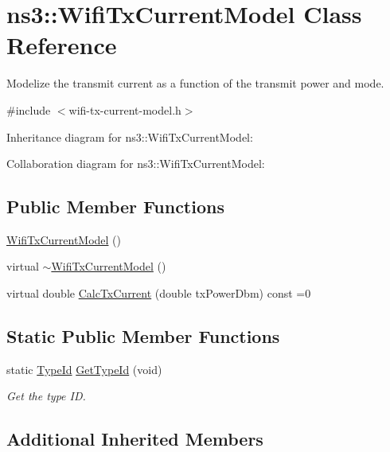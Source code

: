 \hypertarget{classns3_1_1WifiTxCurrentModel}{}\section{ns3\+:\+:Wifi\+Tx\+Current\+Model Class Reference}
\label{classns3_1_1WifiTxCurrentModel}


Modelize the transmit current as a function of the transmit power and mode.  




{\ttfamily \#include $<$wifi-\/tx-\/current-\/model.\+h$>$}



Inheritance diagram for ns3\+:\+:Wifi\+Tx\+Current\+Model\+:


Collaboration diagram for ns3\+:\+:Wifi\+Tx\+Current\+Model\+:
\subsection*{Public Member Functions}
\begin{DoxyCompactItemize}
\item 
\hyperlink{classns3_1_1WifiTxCurrentModel_a28f4130afdaa514c8010b8f17d0c53de}{Wifi\+Tx\+Current\+Model} ()
\item 
virtual \hyperlink{classns3_1_1WifiTxCurrentModel_a23b696c0de8a69d6f66c495a515fd8f9}{$\sim$\+Wifi\+Tx\+Current\+Model} ()
\item 
virtual double \hyperlink{classns3_1_1WifiTxCurrentModel_ae3073f42e7026eecba2286da4c1be18f}{Calc\+Tx\+Current} (double tx\+Power\+Dbm) const =0
\end{DoxyCompactItemize}
\subsection*{Static Public Member Functions}
\begin{DoxyCompactItemize}
\item 
static \hyperlink{classns3_1_1TypeId}{Type\+Id} \hyperlink{classns3_1_1WifiTxCurrentModel_a060b106af09874c306a4e9e15e9b02b3}{Get\+Type\+Id} (void)
\begin{DoxyCompactList}\small\item\em Get the type ID. \end{DoxyCompactList}\end{DoxyCompactItemize}
\subsection*{Additional Inherited Members}


